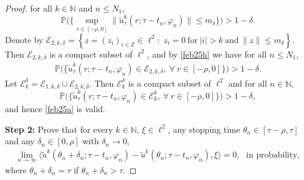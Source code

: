 \documentclass[11pt]{article}
\numberwithin{equation}{section}
\theoremstyle{plain}
\def\be{\begin{equation}}
\def\ee{\end{equation}}
\begin{document}
\begin{proof}
               for all $k\in \mathbb{N}$
               and $n\le N_1$,
                \be\label{feb25h}
                  \mathbb{P}
                  \big
                  (
                       \big \{
                        \sup_{r\in [-\rho, 0]}
                  \|  \widetilde{u}^k_\tau(r; \tau-t_n, \varphi_n)\|
                  \le m_\delta
                    \big  \}
                      \big ) >1-\delta.
               \ee
 Denote by
 $ \mathcal{E}_{2, k, \delta}
     = \left\{ z =(z_i)_{i \in \mathbb{Z}} \in \ell^2 : \; 
                                          z_i = 0 \  \text{for} \ | i | >  k
                                          \  \text{and} \
                                          \| z \| \le m_\delta
         \right\}.
  $
      Then
      $ \mathcal{E}_{2, k, \delta}$
      is a compact subset of $\ell^2$, and by
      \eqref{feb25h} we have  for all  $n\le N_1$,
 \begin{align}\label{feb25i}
    \mathbb{P}
       \Big(
            \big\{     \widetilde{u}
                ^k_\tau(r; \tau-t_n, \varphi_n)\in
                          \mathcal{E}_{2, k, \delta},\
                          \forall \ r\in [-\rho, 0]
           \big\}
       \Big)
   > 1-  \delta. 
 \end{align}
 Let
 $\mathcal{E}^\delta_k
 =  \mathcal{E}_{1, k, \delta}\cup
   \mathcal{E}_{2, k, \delta}$.
   Then $\mathcal{E}^\delta_k$ is a compact subset
   of $\ell^2$
   and  for all  $  n\in\mathbb{N}$,
$$
    \mathbb{P}
       \Big(
            \big\{     \widetilde{u}
                ^k_\tau(r; \tau-t_n, \varphi_n)\in
                          \mathcal{E}^\delta_k ,\
                          \forall \ r\in [-\rho, 0]
           \big\}
       \Big)
   > 1-  \delta,
$$ and hence \eqref{feb25a} is valid.

 
      
      {\bf Step 2:}
      Prove that  for every 
      $k\in \mathbb{N}$, $\xi \in \ell^2$,
      any stopping time $\theta_n \in [\tau - \rho, \tau]$ and 
      any $\delta_n \in [0, \rho]$ with $\delta_n \to 0$,
 \begin{align} \label{feb25j}
       \lim_{n \to \infty} 
            \langle \widetilde{u}^k(\theta_n + \delta_n; \tau-t_n, \varphi_n) 
                          - \widetilde{u}^k(\theta_n; \tau-t_n, \varphi_n), 
                          \xi 
            \rangle = 0, \ \ \  \text{in probability},
 \end{align}
 where $\theta_n + \delta_n = \tau$ if $\theta_n + \delta_n > \tau$. 
 

\end{proof}
\end{document}
